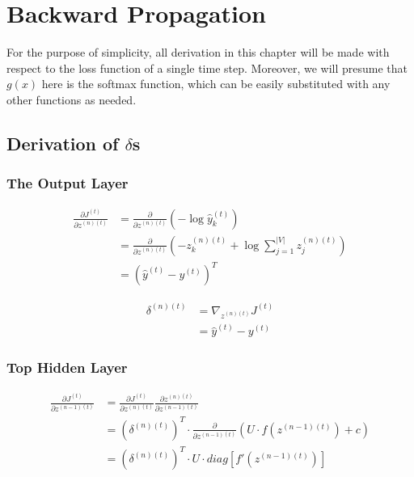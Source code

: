 \documentclass{article}
\begin{document}
	\section{Backward Propagation}
	For the purpose of simplicity, all derivation in this chapter will be made with respect to the loss function of a single time step. Moreover, we will presume that $g(x)$ here is the softmax function, which can be easily substituted with any other functions as needed. 
	\subsection{Derivation of $\delta$s}
	\subsubsection{The Output Layer}
	\begin{equation}
	\begin{aligned}
		\frac{\partial J^{(t)}}{\partial z^{(n)(t)}} 
		&= \frac{\partial}{\partial z^{(n)(t)}} (-\log{\hat{y}^{(t)}_k}) \\
		&= \frac{\partial}{\partial z^{(n)(t)}} (-z^{(n)(t)}_k + \log{\sum_{j=1}^{|V|} z^{(n)(t)}_j}) \\
		&= (\hat{y}^{(t)} - y^{(t)})^T 
	\end{aligned}
	\end{equation}
	
	\begin{equation}
	\begin{aligned}
		\delta^{(n)(t)} 
		&= \nabla_{z^{(n)(t)}} J^{(t)} \\
		&= \hat{y}^{(t)} - y^{(t)} 
	\end{aligned}
	\end{equation}
	
	\subsubsection{Top Hidden Layer}
	\begin{equation}
		\begin{aligned}
		\frac{\partial J^{(t)}}{\partial z^{(n-1)(t)}} 
		&= \frac{\partial J^{(t)}}{\partial z^{(n)(t)}} 
		\frac{\partial z^{(n)(t)}}{\partial z^{(n-1)(t)}} \\
		&= (\delta^{(n)(t)})^T \cdot \frac{\partial}{\partial z^{(n-1)(t)}} (U \cdot f(z^{(n-1)(t)}) + c)\\
		&= (\delta^{(n)(t)})^T \cdot U \cdot diag[f'(z^{(n-1)(t)})]
		\end{aligned}
	\end{equation}
	
\end{document}
